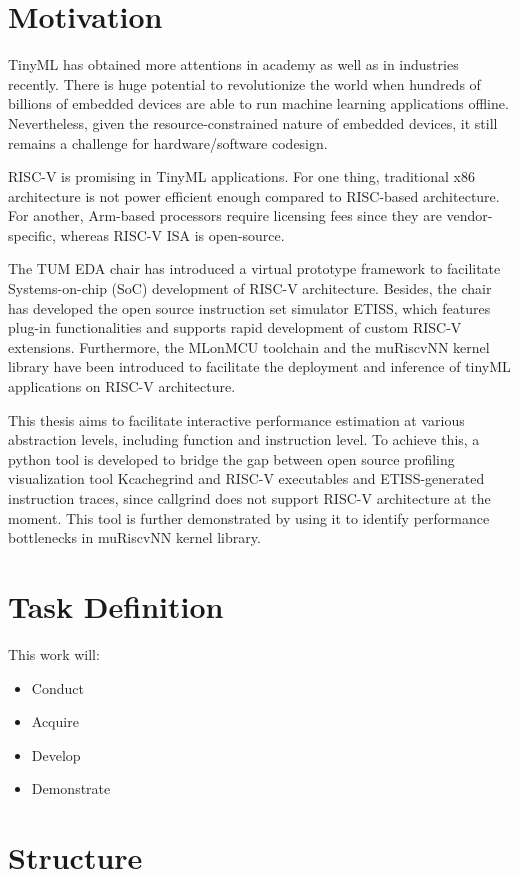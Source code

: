 
\section{Motivation}
\label{sec: motivation}

TinyML has obtained more attentions in academy as well as in industries recently. There is huge potential to revolutionize the world when hundreds of billions of embedded devices are able to
run machine learning applications offline. Nevertheless, given the resource-constrained nature of embedded devices, it still remains a challenge for hardware/software codesign.

RISC-V is promising in TinyML applications. For one thing, traditional x86 architecture is not power efficient enough compared to RISC-based architecture.
For another, Arm-based processors require licensing fees since they are vendor-specific, whereas RISC-V ISA is open-source.

The TUM EDA chair has introduced a virtual prototype framework to facilitate Systems-on-chip (SoC) development of RISC-V architecture. Besides, the chair has developed the open source instruction set simulator ETISS, which features plug-in functionalities and supports rapid development of custom RISC-V extensions. Furthermore, the MLonMCU toolchain and the muRiscvNN kernel library have been introduced to facilitate the deployment and inference of tinyML applications on RISC-V architecture. 

This thesis aims to facilitate interactive performance estimation at various abstraction levels, including function and instruction level. To achieve this, a python tool is developed to bridge the gap between open source profiling visualization tool Kcachegrind and RISC-V executables and ETISS-generated instruction traces, since callgrind does not support RISC-V architecture at the moment. This tool is further demonstrated by using it to identify
performance bottlenecks in muRiscvNN kernel library. 

\section{Task Definition}

This work will:
\begin{itemize}
    \item Conduct
    \item Acquire
    \item Develop
    \item Demonstrate
\end{itemize}

\section{Structure}
